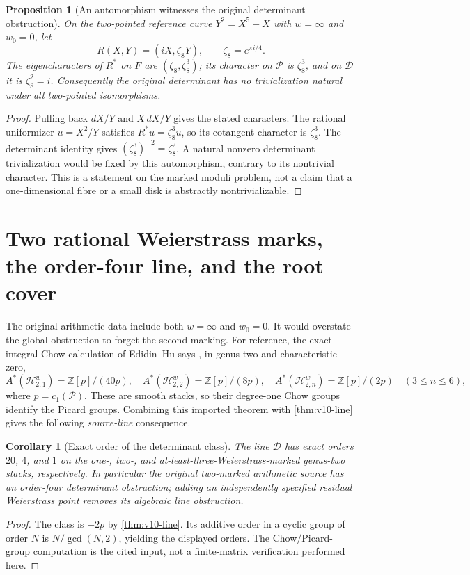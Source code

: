 \documentclass[11pt]{article}
\newtheorem{proposition}[proposition]{Proposition}
\newtheorem{corollary}[corollary]{Corollary}
\theoremstyle{definition}
\theoremstyle{remark}
\newcommand{\Z}{\mathbb Z}
\begin{document}
\begin{proposition}[An automorphism witnesses the original determinant obstruction]
\label{prop:v10-isotropy}
On the two-pointed reference curve
$Y^2=X^5-X$ with $w=\infty$ and $w_0=0$, let
\[
 R(X,Y)=(iX,\zeta_8Y),\qquad\zeta_8=e^{\pi i/4}.
\]
The eigencharacters of $R^*$ on $F$ are $(\zeta_8,\zeta_8^3)$;
its character on $\mathscr P$ is $\zeta_8^3$, and on $\mathscr D$ it
is $\zeta_8^2=i$. Consequently the original determinant has no
trivialization natural under all two-pointed isomorphisms.
\end{proposition}
\begin{proof}
Pulling back $dX/Y$ and $X\,dX/Y$ gives the stated characters. The
rational uniformizer $u=X^2/Y$ satisfies $R^*u=\zeta_8^3u$, so its
cotangent character is $\zeta_8^3$. The determinant identity gives
$(\zeta_8^3)^{-2}=\zeta_8^2$. A natural nonzero determinant
trivialization would be fixed by this automorphism, contrary to its
nontrivial character. This is a statement on the marked moduli problem,
not a claim that a one-dimensional fibre or a small disk is abstractly
nontrivializable.
\end{proof}

\section{Two rational Weierstrass marks, the order-four line, and the root cover}
\label{sec:v10-cover}

The original arithmetic data include both $w=\infty$ and $w_0=0$.
It would overstate the global obstruction to forget the second marking.
For reference, the exact integral Chow calculation of Edidin--Hu says
\cite[Theorems 1.3--1.5]{EdidinHu}, in genus two and characteristic zero,
\[
 A^*(\mathcal H_{2,1}^{w})=\Z[p]/(40p),\quad
 A^*(\mathcal H_{2,2}^{w})=\Z[p]/(8p),\quad
 A^*(\mathcal H_{2,n}^{w})=\Z[p]/(2p)\quad(3\le n\le6),
\]
where $p=c_1(\mathscr P)$. These are smooth stacks, so their degree-one
Chow groups identify the Picard groups. Combining this imported theorem
with \cref{thm:v10-line} gives the following \emph{source-line}
consequence.

\begin{corollary}[Exact order of the determinant class]
\label{cor:v10-order}
The line $\mathscr D$ has exact orders $20$, $4$, and $1$ on the
one-, two-, and at-least-three-Weierstrass-marked genus-two stacks,
respectively. In particular the original two-marked arithmetic source has
an order-four determinant obstruction; adding an independently specified
residual Weierstrass point removes its algebraic line obstruction.
\end{corollary}
\begin{proof}
The class is $-2p$ by \cref{thm:v10-line}. Its additive order in a
cyclic group of order $N$ is $N/\gcd(N,2)$, yielding the displayed
orders. The Chow/Picard-group computation is the cited input, not a
finite-matrix verification performed here.
\end{proof}
\end{document}
